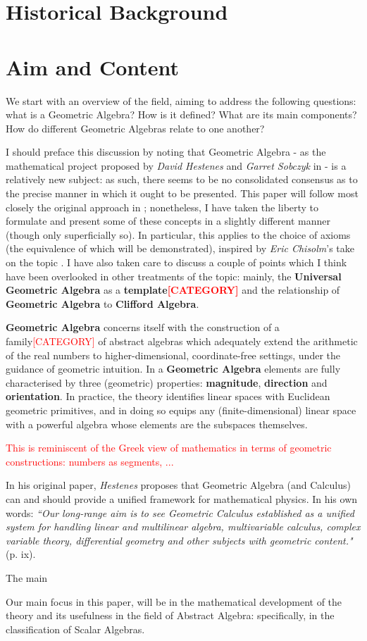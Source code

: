 \section{Historical Background}

\section{Aim and Content}

We start with an overview of the field, aiming to address the following questions: what is a Geometric Algebra? How is it defined? What are its main components? How do different Geometric Algebras relate to one another? 

I should preface this discussion by noting that Geometric Algebra - as the mathematical project proposed by \textit{David Hestenes} and \textit{Garret Sobczyk} in \cite{ga-origin} - is a relatively new subject: as such, there seems to be no consolidated consensus as to the precise manner in which it ought to be presented. This paper will follow most closely the original approach in \cite{ga-origin}; nonetheless, I have taken the liberty to formulate and present some of these concepts in a slightly different manner (though only superficially so). In particular, this applies to the choice of axioms (the equivalence of which will be demonstrated), inspired by \textit{Eric Chisolm}'s take on the topic \cite{ga-chisolm}. I have also taken care to discuss a couple of points which I think have been overlooked in other treatments of the topic: mainly, the \textbf{Universal Geometric Algebra} as a \textbf{template\textcolor{red}{[CATEGORY]}} and the relationship of \textbf{Geometric Algebra} to \textbf{Clifford Algebra}.

\textbf{Geometric Algebra} concerns itself with the construction of a family\textcolor{red}{[CATEGORY]} of abstract algebras which adequately extend the arithmetic of the real numbers to higher-dimensional, coordinate-free settings, under the guidance of geometric intuition. In a \textbf{Geometric Algebra} elements are fully characterised by three (geometric) properties: \textbf{magnitude}, \textbf{direction} and \textbf{orientation}. In practice, the theory identifies linear spaces with Euclidean geometric primitives, and in doing so equips any (finite-dimensional) linear space with a powerful algebra whose elements are the subspaces themselves.

\textcolor{red}{This is reminiscent of the Greek view of mathematics in terms of geometric constructions: numbers as segments, ...}

In his original paper, \textit{Hestenes} proposes that Geometric Algebra (and Calculus) can and should provide a unified framework for mathematical physics. In his own words: \textit{``Our long-range aim is to see Geometric Calculus established as a unified system for handling linear and multilinear algebra, multivariable calculus, complex variable theory, differential geometry and other subjects with geometric content."} (p. ix)\cite{ga-origin}.

The main

Our main focus in this paper, will be in the mathematical development of the theory and its usefulness in the field of Abstract Algebra: specifically, in the classification of Scalar Algebras.
